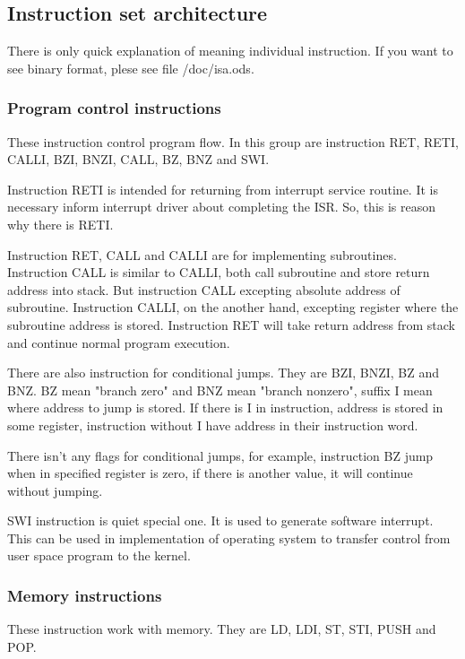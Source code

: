 \subsection{Instruction set architecture}

There is only quick explanation of meaning individual instruction. If you want
to see binary format, plese see file /doc/isa.ods.

\subsubsection{Program control instructions}

These instruction control program flow. In this group are instruction RET,
RETI, CALLI, BZI, BNZI, CALL, BZ, BNZ and SWI.

Instruction RETI is intended for returning from interrupt service routine. It
is necessary inform interrupt driver about completing the ISR. So, this is
reason why there is RETI.

Instruction RET, CALL and CALLI are for implementing subroutines. Instruction
CALL is similar to CALLI, both call subroutine and store return address into
stack. But instruction CALL excepting absolute address of subroutine.
Instruction CALLI, on the another hand, excepting register where the subroutine
address is stored. Instruction RET will take return address from stack and
continue normal program execution.

There are also instruction for conditional jumps. They are BZI, BNZI, BZ and
BNZ. BZ mean "branch zero" and BNZ mean "branch nonzero", suffix I mean where
address to jump is stored. If there is I in instruction, address is stored in
some register, instruction without I have address in their instruction word.

There isn't any flags for conditional jumps, for example, instruction BZ jump
when in specified register is zero, if there is another value, it will continue
without jumping.

SWI instruction is quiet special one. It is used to generate software interrupt.
This can be used in implementation of operating system to transfer control from
user space program to the kernel.

\subsubsection{Memory instructions}

These instruction work with memory. They are LD, LDI, ST, STI, PUSH and POP.

